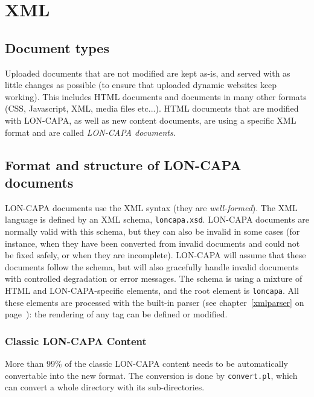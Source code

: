 \chapter{XML}

\section{Document types}
Uploaded documents that are not modified are kept as-is, and served with as little changes as possible (to ensure that uploaded dynamic websites keep working). This includes HTML documents and documents in many other formats (CSS, Javascript, XML, media files etc...).
HTML documents that are modified with LON-CAPA, as well as new content documents, are using a specific XML format and are called \emph{LON-CAPA documents}.

\section{Format and structure of LON-CAPA documents}
LON-CAPA documents use the XML syntax (they are \emph{well-formed}). The XML language is defined by an XML schema, \texttt{loncapa.xsd}. LON-CAPA documents are normally valid with this schema, but they can also be invalid in some cases (for instance, when they have been converted from invalid documents and could not be fixed safely, or when they are incomplete).
LON-CAPA will assume that these documents follow the schema, but will also gracefully handle invalid documents with controlled degradation or error messages.
The schema is using a mixture of HTML and LON-CAPA-specific elements, and the root element is \texttt{loncapa}. All these elements are processed with the built-in parser (see chapter~\ref{xmlparser} on page~\pageref{xmlparser}): the rendering of any tag can be defined or modified.
\subsection{Classic LON-CAPA Content}
More than 99\% of the classic LON-CAPA content needs to be automatically convertable into the new format.
The conversion is done by \texttt{convert.pl}, which can convert a whole directory with its sub-directories.

